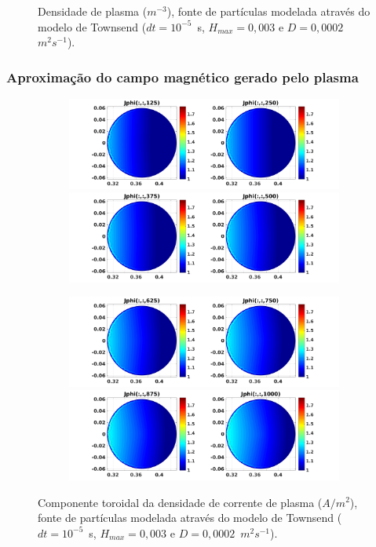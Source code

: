 \documentclass[aspectratio=169]{beamer}
\begin{document}
\begin{frame}
\begin{figure}[H]
\begin{subfigure}{0.43\textwidth}
\end{subfigure}
\caption{Densidade de plasma ($m^{-3}$), fonte de partículas modelada através do modelo de Townsend ($dt=10^{-5}$\ s, $H_{max} = 0,003$ e $D=0,0002$\ $m^2s^{-1}$).}
\label{campplasmasil1}
\end{figure}
\end{frame}

\begin{frame}		
\frametitle{ Aproximação do campo magnético gerado pelo plasma}
\begin{figure}[H]
\begin{subfigure}{0.43\textwidth}
\includegraphics[scale=0.24]{../SImulacao_breakdown/PDE/Jphitod1B8.png}  
\includegraphics[scale=0.24]{../SImulacao_breakdown/PDE/Jphitod2B8.png}
\end{subfigure}
\begin{subfigure}{0.43\textwidth}
\includegraphics[scale=0.24]{../SImulacao_breakdown/PDE/Jphitod3B8.png} 
\includegraphics[scale=0.24]{../SImulacao_breakdown/PDE/Jphitod4B8.png} 
\end{subfigure}
\caption{Componente toroidal da densidade de corrente de plasma ($A/m^2$), fonte de partículas modelada através do modelo de Townsend ($dt=10^{-5}$\ s, $H_{max} = 0,003$ e $D=0,0002$\ $m^2s^{-1}$).}
\label{campplasmasil2}
\end{figure}
\end{frame}
\end{document}
